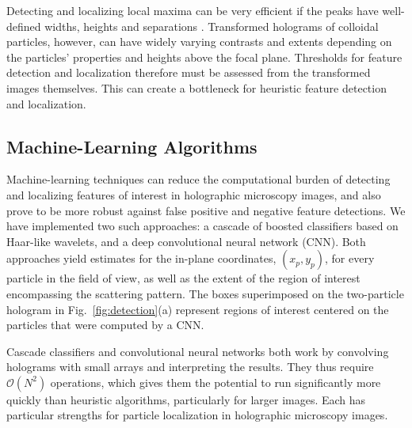 Detecting and localizing local maxima can be very
efficient if the peaks have well-defined widths,
heights and separations \cite{crocker96,allan16trackpy}.
Transformed holograms of colloidal particles, however,
can have widely varying contrasts
and extents depending on the particles' properties and
heights above the focal plane.
Thresholds for feature detection and localization therefore
must be assessed from the transformed images
themselves.
This can create a bottleneck
for
heuristic feature detection and localization.

\subsection{Machine-Learning Algorithms}

Machine-learning techniques can reduce the computational
burden of detecting and localizing features of interest in
holographic microscopy images, and also prove to be more
robust against false positive and negative feature detections.
We have implemented two such approaches:
a cascade of boosted classifiers based on Haar-like wavelets,
and a deep convolutional neural network (CNN).
Both approaches yield estimates for the in-plane
coordinates, $(x_p, y_p)$, for every particle in the field
of view, as well as the extent of the region of interest
encompassing the scattering pattern.
The boxes superimposed on the two-particle hologram in
Fig.~\ref{fig:detection}(a) represent
regions of interest centered on the particles
that were computed by a CNN.

Cascade classifiers and convolutional neural networks
both work by convolving holograms with
small arrays and interpreting the results.
They thus require $\mathcal{O}\left ( N^2 \right )$ operations, which 
gives them the potential to run significantly more
quickly than heuristic algorithms, particularly for
larger images.
Each has particular strengths for particle localization
in holographic microscopy images.

